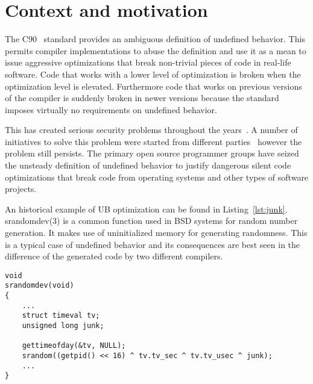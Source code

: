 \section{Context and motivation}


The C90~\cite{iso90} standard provides an ambiguous definition of
undefined behavior. This permits compiler implementations to abuse the
definition and use it as a mean to issue aggressive optimizations that
break non-trivial pieces of code in real-life software. Code that works
with a lower level of optimization is broken when the optimization level
is elevated. Furthermore code that works on previous versions of the
compiler is suddenly broken in newer versions because the standard
imposes virtually no requirements on undefined behavior.

This has created serious security problems throughout the
years~\cite{wang2012undefined,checks2008,funnull,mitre20200452}. A
number of initiatives to solve this problem were started from different
parties~\cite{google2015,regehr2014,wang2013towards,d2015correctness}
however the problem still persists. The primary open source programmer
groups have seized the unsteady definition of undefined behavior to
justify dangerous silent code optimizations that break code from
operating systems and other types of software projects.

An historical example of UB optimization can be found in
Listing~\ref{lst:junk}. srandomdev(3) is a common function used in BSD
systems for random number generation. It makes use of uninitialized
memory for generating randomness. This is a typical case of undefined
behavior and its consequences are best seen in the difference of the
generated code by two different compilers.

\begin{lstlisting}[style=Cstyle, caption={srandom function in
lib/libc/stdlib/random.c on BSD systems}, label={lst:junk}]
void
srandomdev(void)
{
	...
	struct timeval tv;
	unsigned long junk;

	gettimeofday(&tv, NULL);
	srandom((getpid() << 16) ^ tv.tv_sec ^ tv.tv_usec ^ junk);
	...
}
\end{lstlisting}

